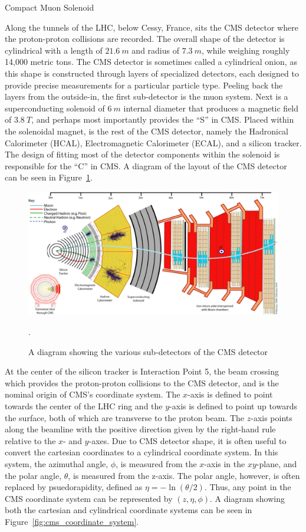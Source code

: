 \begin{section}{Compact Muon Solenoid}

Along the tunnels of the LHC, below Cessy, France, sits the CMS detector where the proton-proton collisions are recorded.
The overall shape of the detector is cylindrical with a length of $21.6~m$ and radius of $7.3~m$, while weighing roughly 14,000 metric tons.  
The CMS detector is sometimes called a cylindrical onion, as this shape is constructed through layers of specialized detectors, each designed to provide precise measurements for a particular particle type.
Peeling back the layers from the outside-in, the first sub-detector is the muon system. 
Next is a superconducting solenoid of $6~m$ internal diameter that produces a magnetic field of $3.8~T$, and perhaps most importantly provides the ``S'' in CMS.
Placed within the solenoidal magnet, is the rest of the CMS detector, namely the Hadronical Calorimeter (HCAL), Electromagnetic Calorimeter (ECAL), and a silicon tracker.
The design of fitting most of the detector components within the solenoid is responsible for the ``C'' in CMS.
A diagram of the layout of the CMS detector can be seen in Figure~\ref{fig:cms_detector}.

\begin{figure}[tbp!]
\begin{center}
\includegraphics[angle=0,width=0.80\columnwidth]{fig/cms_detector.jpg}
\end{center}
\caption{A diagram showing the various sub-detectors of the CMS detector}.
\label{fig:cms_detector}
\end{figure}

At the center of the silicon tracker is Interaction Point 5, the beam crossing which provides the proton-proton collisions to the CMS detector, and is the nominal origin of CMS's coordinate system.
The $x$-axis is defined to point towards the center of the LHC ring and the $y$-axis is defined to point up towards the surface, both of which are transverse to the proton beam. 
The $z$-axis points along the beamline with the positive direction given by the right-hand rule relative to the $x$- and $y$-axes.
Due to CMS detector shape, it is often useful to convert the cartesian coordinates to a cylindrical coordinate system.
In this system, the azimuthal angle, $\phi$, is measured from the $x$-axis in the $xy$-plane, and the polar angle, $\theta$, is measured from the z-axis.
The polar angle, however, is often replaced by psuedorapidity, defined as $\eta = -\ln(\theta/2)$.
Thus, any point in the CMS coordinate system can be represented by $(z, \eta, \phi)$.
A diagram showing both the cartesian and cylindrical coordinate systems can be seen in Figure~\ref{fig:cms_coordinate_system}.


\end{section}
